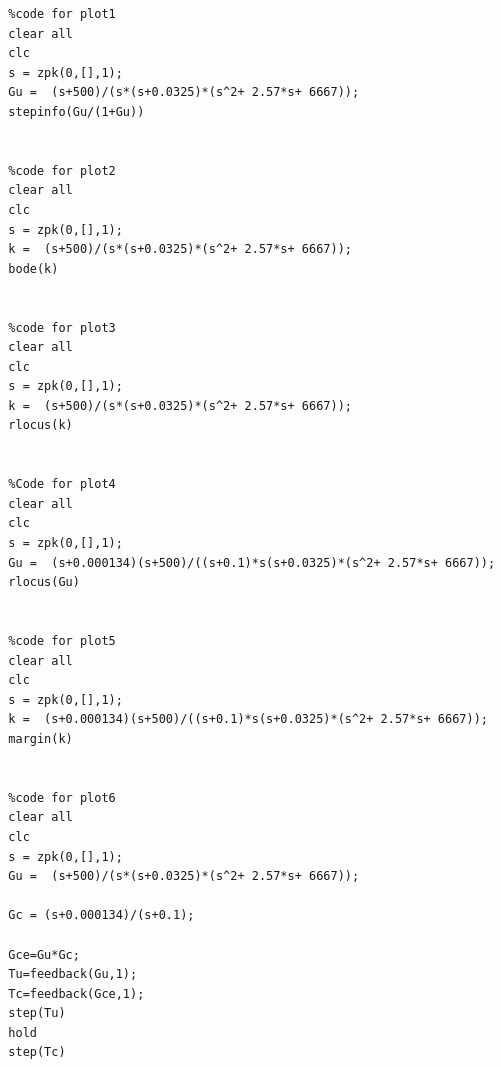 \documentclass[12pt]{article}
\begin{document}
\begin{verbatim}
  %code for plot1
  clear all
  clc
  s = zpk(0,[],1);
  Gu =  (s+500)/(s*(s+0.0325)*(s^2+ 2.57*s+ 6667));
  stepinfo(Gu/(1+Gu))


  %code for plot2
  clear all
  clc
  s = zpk(0,[],1);
  k =  (s+500)/(s*(s+0.0325)*(s^2+ 2.57*s+ 6667));
  bode(k)


  %code for plot3
  clear all
  clc
  s = zpk(0,[],1);
  k =  (s+500)/(s*(s+0.0325)*(s^2+ 2.57*s+ 6667));
  rlocus(k)


  %Code for plot4
  clear all
  clc
  s = zpk(0,[],1);
  Gu =  (s+0.000134)(s+500)/((s+0.1)*s(s+0.0325)*(s^2+ 2.57*s+ 6667));
  rlocus(Gu)


  %code for plot5
  clear all
  clc
  s = zpk(0,[],1);
  k =  (s+0.000134)(s+500)/((s+0.1)*s(s+0.0325)*(s^2+ 2.57*s+ 6667));
  margin(k)


  %code for plot6
  clear all
  clc
  s = zpk(0,[],1);
  Gu =  (s+500)/(s*(s+0.0325)*(s^2+ 2.57*s+ 6667));

  Gc = (s+0.000134)/(s+0.1);

  Gce=Gu*Gc;
  Tu=feedback(Gu,1);
  Tc=feedback(Gce,1);
  step(Tu) 
  hold
  step(Tc)
\end{verbatim}
\end{document}
